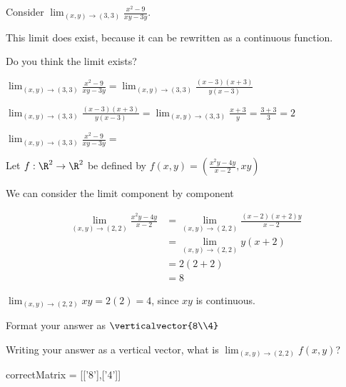 \documentclass{ximera}
\begin{document}
	\begin{question}
		Consider $\displaystyle\lim_{(x,y) \to (3,3)} \frac{x^2-9}{xy-3y}$.
		\begin{solution}
			\begin{hint}
				This limit does exist, because it can be rewritten as a continuous function.
			\end{hint}
			Do you think the limit exists?
				\begin{multiple-choice}
				\end{multiple-choice}
		\end{solution}
		
		\begin{solution}
			\begin{hint}
				$\displaystyle\lim_{(x,y) \to (3,3)} \frac{x^2-9}{xy-3y} = \displaystyle\lim_{(x,y) \to (3,3)} \frac{(x-3)(x+3)}{y(x-3)}$
			\end{hint}
			\begin{hint}
				$\displaystyle\lim_{(x,y) \to (3,3)} \frac{(x-3)(x+3)}{y(x-3)} = \displaystyle\lim_{(x,y) \to (3,3)} \frac{x+3}{y} = \frac{3+3}{3} = 2$
			\end{hint}
			$\displaystyle\lim_{(x,y) \to (3,3)} \frac{x^2-9}{xy-3y} = $\answer{$2$}
		\end{solution}		
		
	\end{question}
	
	\begin{question}
		Let $f:\R^2 \to \R^2$ be defined by $f(x,y) = (\frac{x^2y-4y}{x-2},xy)$
		\begin{solution}
			\begin{hint}
				We can consider the limit component by component
			\end{hint}
			\begin{hint}
				\begin{align*}
					\displaystyle\lim_{(x,y) \to (2,2)} \frac{x^2y-4y}{x-2} &= \displaystyle\lim_{(x,y) \to (2,2)} \frac{(x-2)(x+2)y}{x-2}\\
						&= \displaystyle\lim_{(x,y) \to (2,2)} y(x+2)\\
						&= 2(2+2)\\
						&= 8
				\end{align*}
			\end{hint}
			\begin{hint}
				$\displaystyle\lim_{(x,y) \to (2,2)} xy = 2(2) =4$, since $xy$ is continuous.
			\end{hint}
			\begin{hint}
				Format your answer as $\verticalvector{8\\4}$
			\end{hint}
			Writing your answer as a vertical vector, what is $\displaystyle\lim_{(x,y) \to (2,2)} f(x,y)$?
			\begin{matrix-answer}[name  = v]
			 	correctMatrix  = [['8'],['4']]
			\end{matrix-answer}
		\end{solution}
	\end{question}
	
\end{document}
